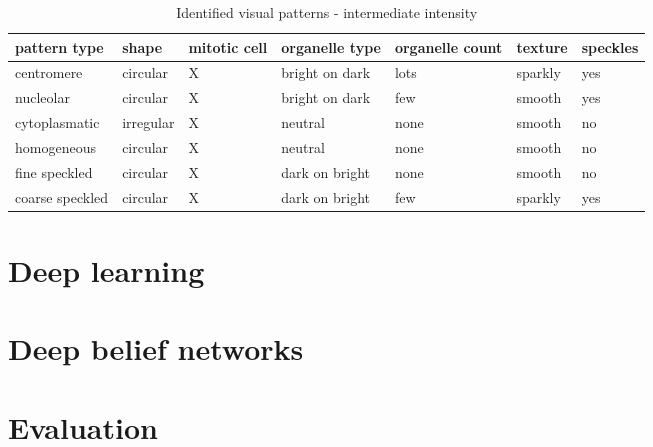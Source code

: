\begin{table}
	\caption{Identified visual patterns - intermediate intensity}
	\label{tab:Vpatb}
	\begin{tabular}{|m{2.2cm}|m{1.7cm}|m{2cm}|m{2cm}|m{1.2cm}|m{2cm}|m{1.2cm}|}
		\hline
		\textbf{pattern type} & \textbf{shape} & \textbf{mitotic cell} & \textbf{organelle type} & \textbf{organelle count} & \textbf{texture} & \textbf{speckles} \\ \hline
		centromere & circular & X & bright on dark & lots & sparkly  & yes \\ \hline
		nucleolar & circular & X & bright on dark & few & smooth & yes \\ \hline
		cytoplasmatic & irregular & X & neutral & none & smooth  & no \\ \hline
		homogeneous & circular & X & neutral & none & smooth & no \\ \hline
		fine speckled & circular & X & dark on bright & none & smooth & no \\ \hline
		coarse speckled & circular & X & dark on bright & few & sparkly & yes \\ \hline
	\end{tabular}
\end{table}



\section{Deep learning}






\section{Deep belief networks}






\section{Evaluation}

